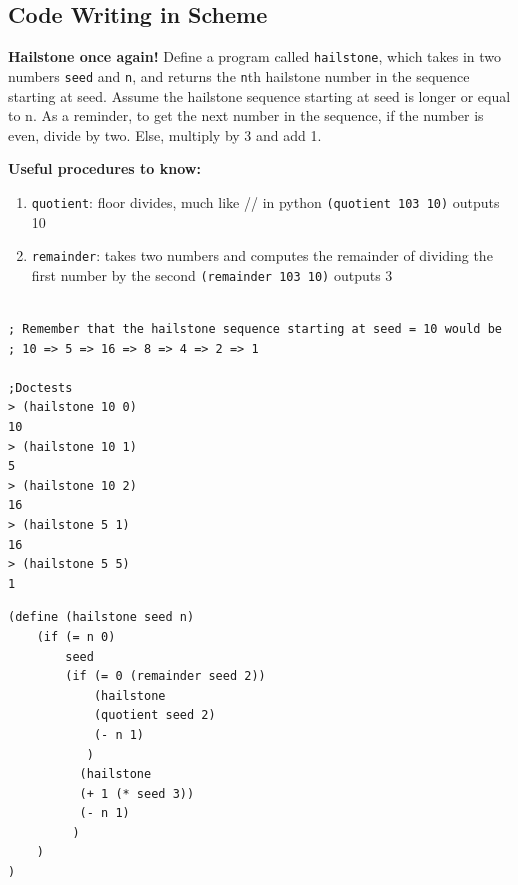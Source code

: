\documentclass{exam}
\begin{document}
\begin{questions}
\section{Code Writing in Scheme}

\begin{blocksection}
\question \textbf{Hailstone once again!} Define a program called \texttt{hailstone}, which takes in two numbers \texttt{seed} and \texttt{n}, and returns the \texttt{n}th hailstone number in the sequence starting at seed. Assume the hailstone sequence starting at seed is longer or equal to n. As a reminder, to get the next number in the sequence, if the number is even, divide by two. Else, multiply by 3 and add 1. \newline

\textbf{Useful procedures to know:} \newline
\begin{enumerate}
\item \texttt{quotient}: floor divides, much like // in python 
\subitem \texttt{(quotient 103 10)} outputs 10 
\item \texttt{remainder}: takes two numbers and computes the remainder of dividing the first number by the second
\subitem \texttt{(remainder 103 10)} outputs 3
\end{enumerate}

\begin{lstlisting}

; Remember that the hailstone sequence starting at seed = 10 would be
; 10 => 5 => 16 => 8 => 4 => 2 => 1

;Doctests
> (hailstone 10 0)
10
> (hailstone 10 1)
5
> (hailstone 10 2)
16
> (hailstone 5 1)
16 
> (hailstone 5 5)
1
\end{lstlisting}

\begin{solution}[1in]
\begin{lstlisting}
(define (hailstone seed n)
    (if (= n 0)
        seed
        (if (= 0 (remainder seed 2))
            (hailstone 
            (quotient seed 2) 
            (- n 1)
           )
          (hailstone 
          (+ 1 (* seed 3)) 
          (- n 1)
         )
    )
)
\end{lstlisting}
\end{solution}
\end{blocksection}


\end{questions}
\end{document}
